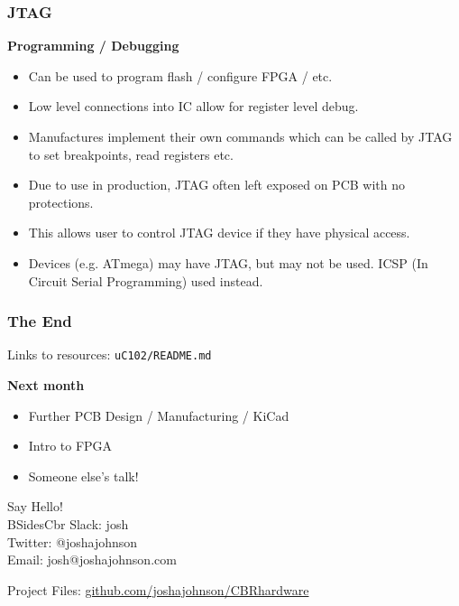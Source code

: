 \documentclass[t]{beamer}
\begin{document}
\begin{frame}[t]
\end{frame}


\begin{frame}[t]
\frametitle{JTAG}
\textbf{Programming / Debugging}
\begin{itemize}
	\item Can be used to program flash / configure FPGA / etc.
	\item Low level connections into IC allow for register level debug.
	\item Manufactures implement their own commands which can be called by JTAG to set breakpoints, read registers etc.
	\item Due to use in production, JTAG often left exposed on PCB with no protections. 
	\item This allows user to control JTAG device if they have physical access. 
	\item Devices (e.g. ATmega) may have JTAG, but may not be used. ICSP (In Circuit Serial Programming) used instead. 
\end{itemize}

\end{frame}


\begin{frame}
\frametitle{The End}
Links to resources: \texttt{uC102/README.md}
\vspace{5mm}

\textbf{Next month}
\begin{itemize}
	\item Further PCB Design / Manufacturing / KiCad
	\item Intro to FPGA
	\item Someone else's talk!
\end{itemize}

\vspace{5mm}
Say Hello! \\
BSidesCbr Slack: josh\\
Twitter:  @\textunderscore joshajohnson\\
Email: josh@joshajohnson.com\\
\vspace{4mm}

Project Files: \url{github.com/joshajohnson/CBRhardware}\\
\end{frame}
\end{document}
